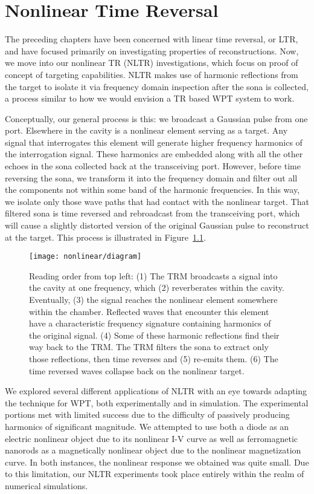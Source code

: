 \chapter{Nonlinear Time Reversal}
\label{ch:nltr}

The preceding chapters have been concerned with linear time reversal, or LTR, and have focused primarily on investigating properties of reconstructions. Now, we move into our nonlinear TR (NLTR) investigations, which focus on proof of concept of targeting capabilities. NLTR makes use of harmonic reflections from the target to isolate it via frequency domain inspection after the sona is collected, a process similar to how we would envision a TR based WPT system to work.

Conceptually, our general process is this: we broadcast a Gaussian pulse from one port. Elsewhere in the cavity is a nonlinear element serving as a target. Any signal that interrogates this element will generate higher frequency harmonics of the interrogation signal. These harmonics are embedded along with all the other echoes in the sona collected back at the transceiving port. However, before time reversing the sona, we transform it into the frequency domain and filter out all the components not within some band of the harmonic frequencies. In this way, we isolate only those wave paths that had contact with the nonlinear target. That filtered sona is time reversed and rebroadcast from the transceiving port, which will cause a slightly distorted version of the original Gaussian pulse to reconstruct at the target. This process is illustrated in Figure~\ref{fig:nonlinear-diagram}.

\begin{figure}[]
\centering
\texttt{[image: nonlinear/diagram]}
    \caption[Conceptual overview of nonlinear time reversal]{Reading order from top left: (1) The TRM broadcasts a signal into the cavity at one frequency, which (2) reverberates within the cavity. Eventually, (3) the signal reaches the nonlinear element somewhere within the chamber. Reflected waves that encounter this element have a characteristic frequency signature containing harmonics of the original signal. (4) Some of these harmonic reflections find their way back to the TRM. The TRM filters the sona to extract only those reflections, then time reverses and (5) re-emits them. (6) The time reversed waves collapse back on the nonlinear target.}
    \label{fig:nonlinear-diagram}
\end{figure}

We explored several different applications of NLTR with an eye towards adapting the technique for WPT, both experimentally and in simulation. The experimental portions met with limited success due to the difficulty of passively producing harmonics of significant magnitude. We attempted to use both a diode as an electric nonlinear object due to its nonlinear I-V curve as well as ferromagnetic nanorods as a magnetically nonlinear object due to the nonlinear magnetization curve. In both instances, the nonlinear response we obtained was quite small. Due to this limitation, our NLTR experiments took place entirely within the realm of numerical simulations.
